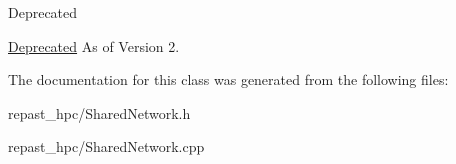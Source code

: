 \begin{DoxyRefDesc}{Deprecated}
\item[\hyperlink{deprecated__deprecated000003}{Deprecated}]As of Version 2. \end{DoxyRefDesc}


The documentation for this class was generated from the following files\-:\begin{DoxyCompactItemize}
\item 
repast\-\_\-hpc/Shared\-Network.\-h\item 
repast\-\_\-hpc/Shared\-Network.\-cpp\end{DoxyCompactItemize}

